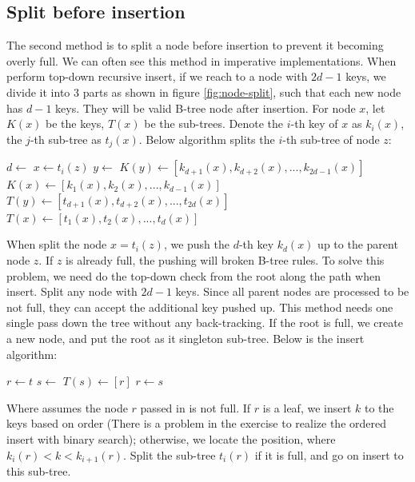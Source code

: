 \documentclass[b5paper]{article}
\begin{document}
\subsection{Split before insertion}

The second method is to split a node before insertion to prevent it becoming overly full. We can often see this method in imperative implementations. When perform top-down recursive insert, if we reach to a node with $2d - 1$ keys, we divide it into 3 parts as shown in figure \ref{fig:node-split}, such that each new node has $d - 1$ keys. They will be valid B-tree node after insertion. For node $x$, let $K(x)$ be the keys, $T(x)$ be the sub-trees. Denote the $i$-th key of $x$ as $k_i(x)$, the $j$-th sub-tree as $t_j(x)$. Below algorithm splits the $i$-th sub-tree of node $z$:

\begin{algorithmic}[1]
  \State $d \gets$ 
  \State $x \gets t_i(z)$
  \State $y \gets$ 
  \State $K(y) \gets [k_{d + 1}(x), k_{d + 2}(x), ..., k_{2d - 1}(x)]$
  \State $K(x) \gets [k_1(x), k_2(x), ..., k_{d-1}(x)]$
    \State $T(y) \gets [t_{d + 1}(x), t_{d + 2}(x), ..., t_{2d}(x)]$
    \State $T(x) \gets [t_1(x), t_2(x), ..., t_d(x)]$
  \EndIf
  \State {}
  \State {}
\EndProcedure
\end{algorithmic}

When split the node $x = t_i(z)$, we push the $d$-th key $k_d(x)$ up to the parent node $z$. If $z$ is already full, the pushing will broken B-tree rules. To solve this problem, we need do the top-down check from the root along the path when insert. Split any node with $2d - 1$ keys. Since all parent nodes are processed to be not full, they can accept the additional key pushed up. This method needs one single pass down the tree without any back-tracking. If the root is full, we create a new node, and put the root as it singleton sub-tree. Below is the insert algorithm:

\begin{algorithmic}[1]
  \State $r \gets t$
   
    \State $s \gets$ 
    \State $T(s) \gets [ r ]$
    \State {}
    \State $r \gets s$
  \EndIf
  \State \Return {}
\EndFunction
\end{algorithmic}

Where  assumes the node $r$ passed in
is not full. If $r$ is a leaf, we insert $k$ to the keys based on order (There is a problem in the exercise to realize the ordered insert with binary search); otherwise, we locate the position, where $k_i(r) < k < k_{i+1}(r)$. Split the sub-tree $t_i(r)$ if it is full, and go on insert to this sub-tree.
\end{document}
